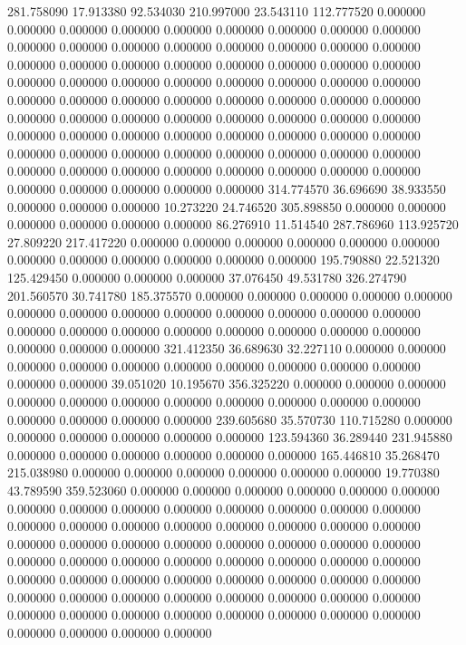 281.758090 17.913380 92.534030
210.997000 23.543110 112.777520
0.000000 0.000000 0.000000
0.000000 0.000000 0.000000
0.000000 0.000000 0.000000
0.000000 0.000000 0.000000
0.000000 0.000000 0.000000
0.000000 0.000000 0.000000
0.000000 0.000000 0.000000
0.000000 0.000000 0.000000
0.000000 0.000000 0.000000
0.000000 0.000000 0.000000
0.000000 0.000000 0.000000
0.000000 0.000000 0.000000
0.000000 0.000000 0.000000
0.000000 0.000000 0.000000
0.000000 0.000000 0.000000
0.000000 0.000000 0.000000
0.000000 0.000000 0.000000
0.000000 0.000000 0.000000
0.000000 0.000000 0.000000
0.000000 0.000000 0.000000
0.000000 0.000000 0.000000
0.000000 0.000000 0.000000
0.000000 0.000000 0.000000
0.000000 0.000000 0.000000
0.000000 0.000000 0.000000
0.000000 0.000000 0.000000
314.774570 36.696690 38.933550
0.000000 0.000000 0.000000
10.273220 24.746520 305.898850
0.000000 0.000000 0.000000
0.000000 0.000000 0.000000
86.276910 11.514540 287.786960
113.925720 27.809220 217.417220
0.000000 0.000000 0.000000
0.000000 0.000000 0.000000
0.000000 0.000000 0.000000
0.000000 0.000000 0.000000
195.790880 22.521320 125.429450
0.000000 0.000000 0.000000
37.076450 49.531780 326.274790
201.560570 30.741780 185.375570
0.000000 0.000000 0.000000
0.000000 0.000000 0.000000
0.000000 0.000000 0.000000
0.000000 0.000000 0.000000
0.000000 0.000000 0.000000
0.000000 0.000000 0.000000
0.000000 0.000000 0.000000
0.000000 0.000000 0.000000
321.412350 36.689630 32.227110
0.000000 0.000000 0.000000
0.000000 0.000000 0.000000
0.000000 0.000000 0.000000
0.000000 0.000000 0.000000
39.051020 10.195670 356.325220
0.000000 0.000000 0.000000
0.000000 0.000000 0.000000
0.000000 0.000000 0.000000
0.000000 0.000000 0.000000
0.000000 0.000000 0.000000
239.605680 35.570730 110.715280
0.000000 0.000000 0.000000
0.000000 0.000000 0.000000
123.594360 36.289440 231.945880
0.000000 0.000000 0.000000
0.000000 0.000000 0.000000
165.446810 35.268470 215.038980
0.000000 0.000000 0.000000
0.000000 0.000000 0.000000
19.770380 43.789590 359.523060
0.000000 0.000000 0.000000
0.000000 0.000000 0.000000
0.000000 0.000000 0.000000
0.000000 0.000000 0.000000
0.000000 0.000000 0.000000
0.000000 0.000000 0.000000
0.000000 0.000000 0.000000
0.000000 0.000000 0.000000
0.000000 0.000000 0.000000
0.000000 0.000000 0.000000
0.000000 0.000000 0.000000
0.000000 0.000000 0.000000
0.000000 0.000000 0.000000
0.000000 0.000000 0.000000
0.000000 0.000000 0.000000
0.000000 0.000000 0.000000
0.000000 0.000000 0.000000
0.000000 0.000000 0.000000
0.000000 0.000000 0.000000
0.000000 0.000000 0.000000
0.000000 0.000000 0.000000
0.000000 0.000000 0.000000
